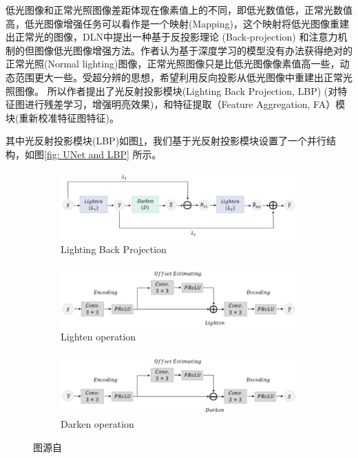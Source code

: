 \documentclass[a4paper]{ctexart}
\begin{document}
	低光图像和正常光照图像差距体现在像素值上的不同，即低光数值低，正常光数值高，低光图像增强任务可以看作是一个映射(Mapping)，这个映射将低光图像重建出正常光的图像，DLN\cite{DLN2020}中提出一种基于反投影理论 (Back-projection) 和注意力机制的但图像低光图像增强方法。作者认为基于深度学习的模型没有办法获得绝对的正常光照(Normal lighting)图像，正常光照图像只是比低光图像像素值高一些，动态范围更大一些。受超分辨\cite{haris2018deep}的思想，希望利用反向投影从低光图像中重建出正常光照图像。 所以作者提出了光反射投影模块(Lighting Back Projection, LBP) (对特征图进行残差学习，增强明亮效果)，和特征提取（Feature Aggregation, FA）模块(重新校准特征图特征)。
	
	其中光反射投影模块(LBP)如图\ref{fig: LBP}，我们基于光反射投影模块设置了一个并行结构，如图\ref{fig: UNet and LBP} 所示。
	
	\begin{figure}[htbp]
		\centering
		\begin{subfigure}{0.5\textwidth}
			\includegraphics[width=\linewidth]{picture/LLIE/Experiment/LBP}
			\captionsetup{font=scriptsize}
			\caption{Lighting Back Projection}
			\label{fig: LBP}
		\end{subfigure}
		\begin{subfigure}{0.5\textwidth}
			\includegraphics[width=\linewidth]{picture/LLIE/Experiment/Lighten operation}
			\captionsetup{font=scriptsize}
			\caption{Lighten operation}
			\label{fig: Lighten operation}	
		\end{subfigure}
		\begin{subfigure}{0.5\textwidth}
			\includegraphics[width=\linewidth]{picture/LLIE/Experiment/Darken operation}
			\captionsetup{font=scriptsize}
			\caption{Darken operation}
			\label{fig: Darken operation}	
		\end{subfigure}
		\caption{图源自\cite{shen2022low}}
	\end{figure}
	
\end{document}
